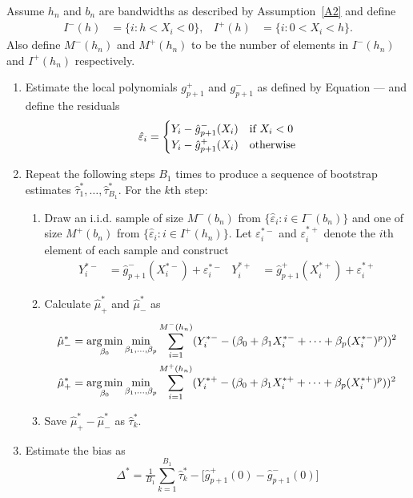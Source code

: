 \documentclass[12pt,fleqn]{article}
\begin{document}
\begin{algorithm}\label{Alg1}
  Assume $h_{n}$ and $b_{n}$ are bandwidths as described by Assumption~\ref{A2} and define
  \begin{align}
    I^{-}(h) &= \{i : h < X_{i} < 0\}, &
    I^{+}(h) &= \{i : 0 < X_{i} < h\}.
  \end{align}
  Also define $M^{-}(h_{n})$ and $M^{+}(h_{n})$ to be the number of elements in
  $I^{-}(h_{n})$ and $I^{+}(h_{n})$ respectively.
  \begin{enumerate}
  \item Estimate the local polynomials $g_{p+1}^{+}$ and $g_{p+1}^{-}$ as defined by
    Equation --- and define the residuals
    \begin{equation}
      \label{eq:1}
      \hat\varepsilon_{i} =
      \begin{cases}
        Y_{i} - \hat g_{p+1}^-(X_{i}) & \text{if}\ X_{i} < 0 \\
        Y_{i} - \hat g_{p+1}^+(X_{i}) & \text{otherwise}
      \end{cases}
    \end{equation}
  \item Repeat the following steps $B_1$ times to produce a sequence of bootstrap
    estimates $\hat\tau_1^*,\dots,\hat\tau_{B_1}^*$. For the $k$th step:
    \begin{enumerate}
    \item Draw an i.i.d. sample of size $M^-(b_n)$ from
      $\{\hat\varepsilon_i : i \in I^-(b_n)\}$ and one of size $M^+(b_n)$ from
      $\{\hat\varepsilon_i : i \in I^+(h_n)\}$. Let $\varepsilon_i^{*-}$ and
      $\varepsilon_i^{*+}$ denote the $i$th element of each sample and construct
      \begin{align}
        Y_i^{*-} &= \hat g_{p+1}^-(X_i^{*-}) + \varepsilon_i^{*-} &
        Y_i^{*+} &= \hat g_{p+1}^+(X_i^{*+}) + \varepsilon_i^{*+}
      \end{align}
    \item Calculate $\hat\mu_+^*$ and $\hat\mu_-^*$ as
      \begin{align}
        \hat\mu_-^*
        &= \operatorname*{arg\,min}_{\beta_0} \min_{\beta_1,\dots,\beta_p}
          \sum_{i = 1}^{M^-(h_n)} (Y_i^{*-} -
          (\beta_0 + \beta_1 X_i^{*-} + \cdots + \beta_p (X_i^{*-})^p))^2 \\
        \hat\mu_+^*
        &= \operatorname*{arg\,min}_{\beta_0} \min_{\beta_1,\dots,\beta_p}
          \sum_{i = 1}^{M^+(h_n)} (Y_i^{*+} -
          (\beta_0 + \beta_1 X_i^{*+} + \cdots + \beta_p (X_i^{*+})^p))^2
      \end{align}
    \item Save $\hat\mu_+^* - \hat\mu_-^*$ as $\hat\tau^*_k$.
    \end{enumerate}
  \item Estimate the bias as
    \begin{equation}
      \label{eq:2}
      \Delta^* = \tfrac{1}{B_1} \sum_{k=1}^{B_1} \hat\tau^*_k -
      \big[\hat g_{p+1}^+(0) - \hat g_{p+1}^-(0)\big]
    \end{equation}
  \end{enumerate}
\end{algorithm}
\end{document}
